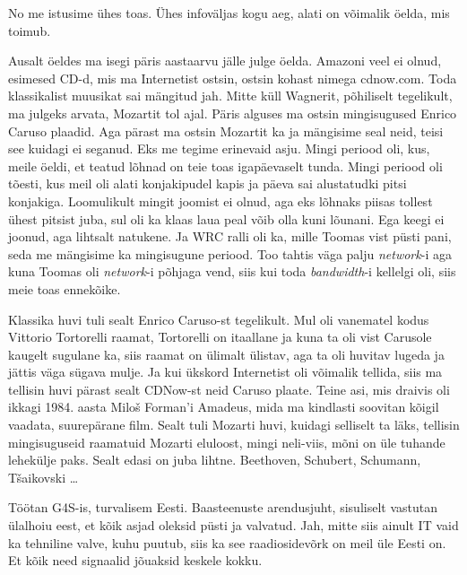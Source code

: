 
No me istusime ühes toas. Ühes infoväljas kogu aeg, alati on võimalik öelda, 
mis toimub.


Ausalt öeldes ma isegi päris aastaarvu jälle julge öelda. Amazoni veel ei olnud, 
esimesed CD-d, mis ma Internetist ostsin, ostsin kohast nimega cdnow.com. 
Toda klassikalist muusikat sai mängitud jah. Mitte küll 
Wagnerit, põhiliselt tegelikult, ma julgeks arvata, Mozartit tol ajal. Päris 
alguses ma ostsin mingisugused Enrico Caruso plaadid. Aga pärast ma ostsin 
Mozartit ka ja mängisime seal neid, teisi see kuidagi ei seganud. Eks me tegime 
erinevaid asju. Mingi periood oli, kus, meile öeldi, et teatud lõhnad on teie 
toas igapäevaselt tunda. Mingi periood oli tõesti, kus meil oli alati 
konjakipudel kapis  ja päeva sai alustatudki pitsi konjakiga. Loomulikult 
mingit joomist ei olnud, aga eks lõhnaks piisas tollest ühest pitsist juba, sul oli ka klaas 
laua peal võib olla kuni lõunani. Ega keegi ei joonud, aga lihtsalt natukene. 
Ja WRC ralli oli ka, mille Toomas vist püsti pani, seda me 
mängisime ka  mingisugune periood. Too tahtis väga palju \emph{network}-i 
aga kuna Toomas oli \emph{network}-i põhjaga vend, siis kui toda 
\emph{bandwidth}-i kellelgi oli, siis meie toas ennekõike.


Klassika huvi tuli sealt Enrico Caruso-st tegelikult. Mul oli vanematel kodus 
Vittorio Tortorelli raamat, Tortorelli  on itaallane ja kuna ta oli vist 
Carusole kaugelt sugulane ka, siis raamat 
on ülimalt ülistav, aga ta oli huvitav lugeda ja jättis väga sügava mulje. 
Ja kui ükskord Internetist  oli võimalik tellida, siis ma tellisin huvi pärast sealt 
CDNow-st neid Caruso plaate. Teine asi, mis draivis oli ikkagi 1984. aasta 
Miloš Forman'i Amadeus, mida ma kindlasti soovitan kõigil vaadata, suurepärane 
film. Sealt tuli Mozarti huvi, kuidagi selliselt ta läks,  tellisin 
mingisuguseid raamatuid Mozarti eluloost, mingi neli-viis, mõni on üle tuhande 
lehekülje paks. Sealt edasi on juba  lihtne. Beethoven, Schubert, 
Schumann, Tšaikovski \ldots


Töötan G4S-is, turvalisem Eesti. Baasteenuste arendusjuht,  
sisuliselt  vastutan ülalhoiu eest, et kõik asjad oleksid püsti ja valvatud. 
Jah, mitte siis ainult IT vaid ka  tehniline valve, kuhu puutub, siis ka see 
raadiosidevõrk on meil üle Eesti on. Et kõik need signaalid jõuaksid  keskele 
kokku.

